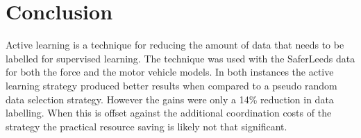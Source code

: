 \section{Conclusion} Active learning is a technique for reducing the amount of data that needs to be labelled for supervised learning. The technique was used with the SaferLeeds data for both the force and the motor vehicle models. In both instances the active learning strategy produced better results when compared to a pseudo random data selection strategy. However the gains were only a 14\% reduction in data labelling. When this is offset against the additional coordination costs of the strategy the practical resource saving is likely not that significant. 
 
